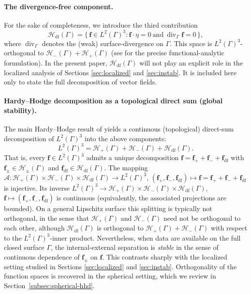 \documentclass[a4paper, 11pt]{article}
\newcommand{\f}{\mathbf{f}}
\begin{document}
\paragraph{The divergence-free component.}
For the sake of completeness, we introduce the third contribution
\begin{equation}\label{eq:Hdf_def}
\mathcal H_{\mathrm{df}}(\Gamma)
= \Big\{\, \f\in L^2(\Gamma)^3 : \f\cdot\eta = 0 \ \text{and}\ \operatorname{div}_\Gamma \f = 0 \,\Big\},
\end{equation}
where $\operatorname{div}_\Gamma$ denotes the (weak) surface-divergence on $\Gamma$.
This space is $L^2(\Gamma)^3$-orthogonal to $\mathcal H_-(\Gamma) +\mathcal H_+(\Gamma)$ (see \cite{BGK} for the precise functional-analytic formulation).
In the present paper, $\mathcal H_{\mathrm{df}}(\Gamma)$ will not play an explicit role in the localized analysis of
Sections \ref{sec:localized} and \ref{sec:instab}. It is included here only to state the full decomposition of vector fields.

\paragraph{Hardy--Hodge decomposition as a topological direct sum (global stability).}
The main Hardy--Hodge result of \cite{BGK} yields a continuous (topological) direct-sum decomposition of $L^2(\Gamma)^3$ into the above components:
\begin{equation}\label{eq:HHD_topological}
	L^2(\Gamma)^3=\mathcal H_+(\Gamma)+ \mathcal H_-(\Gamma)+ \mathcal H_{\mathrm{df}}(\Gamma).
\end{equation}
That is, every $\f\in L^2(\Gamma)^3$ admits a unique decomposition $\f = \f_+ +\f_- +\f_{\mathrm{df}}$ with $\f_\pm\in\mathcal H_\pm(\Gamma)$ and $\f_{\mathrm{df}}\in\mathcal H_{\mathrm{df}}(\Gamma)$. The mapping $\mathcal{A}:\mathcal H_+(\Gamma) \times \mathcal H_-(\Gamma)\times \mathcal H_{\mathrm{df}}(\Gamma)\to L^2(\Gamma)^3$, $(\f_+,\f_-,\f_{\mathrm{df}})\mapsto \f=\f_++\f_-+\f_{\mathrm{df}}$ is injective. Its inverse  $L^2(\Gamma)^3\to\mathcal H_+(\Gamma) \times \mathcal H_-(\Gamma)\times \mathcal H_{\mathrm{df}}(\Gamma)$, $\f\mapsto(\f_+,\f_-,\f_{\mathrm{df}})$ is continuous (equivalently, the associated projections are bounded). On a general Lipschitz surface this splitting is typically {not} orthogonal, in the sense that $\mathcal H_+(\Gamma)$ and $\mathcal H_-(\Gamma)$ need not be orthogonal to each other, although $\mathcal H_{\mathrm{df}}(\Gamma)$ is orthogonal to $\mathcal H_+ (\Gamma) +\mathcal H_-(\Gamma)$ with respect to the $L^2(\Gamma)^3$-inner product. Nevertheless, when data are available on the full closed surface $\Gamma$, the internal-external separation is \emph{stable} in the sense of continuous dependence of $\f_\pm$ on $\f$. This contrasts sharply with the localized setting studied in Sections \ref{sec:localized} and \ref{sec:instab}. Orthogonality of the function spaces is recovered in the spherical setting, which we review in Section~\ref{subsec:spherical-hhd}.
	
\end{document}
